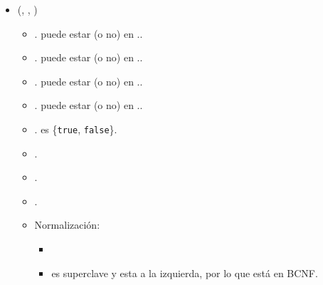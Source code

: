 \begin{itemize}
        \item {}(, , 
            )
            \begin{itemize}
                \item {}. puede estar (o no) en 
                    ..
                \item {}. puede estar (o no) en 
                    ..
                \item {}. puede estar (o no) en 
                    ..
                \item {}. puede estar (o no) en 
                    ..
                \item {}. es \{\texttt{true}, 
                        \texttt{false}\}.
                \item {}.
                \item {}.
                \item \FK{$\emptyset$}.
                \item Normalización:
                    \begin{itemize}
                        \item {}
                        \item {} es superclave y esta a la 
                            izquierda, por lo que está en BCNF.
                    \end{itemize}
            \end{itemize}



\end{itemize}
